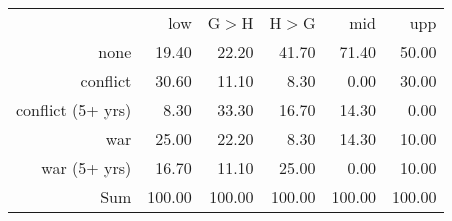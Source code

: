 \begin{table}[ht]
\centering
\begin{tabular}{rrrrrr}
\hline
                  & low    & G$>$H  & H$>$G  & mid    & upp \\
none              & 19.40  & 22.20  & 41.70  & 71.40  & 50.00 \\
conflict          & 30.60  & 11.10  & 8.30   & 0.00   & 30.00 \\
conflict (5+ yrs) & 8.30   & 33.30  & 16.70  & 14.30  & 0.00 \\
war               & 25.00  & 22.20  & 8.30   & 14.30  & 10.00 \\
war (5+ yrs)      & 16.70  & 11.10  & 25.00  & 0.00   & 10.00 \\
Sum               & 100.00 & 100.00 & 100.00 & 100.00 & 100.00 \\
\hline
\end{tabular}
\end{table}
